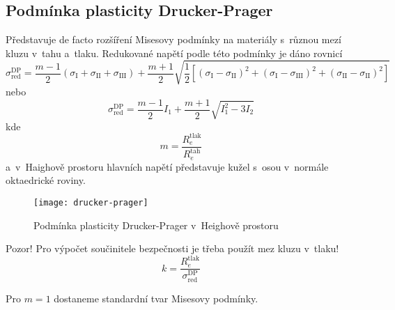 
\subsection{Podmínka plasticity Drucker-Prager}\label{sec:drucker-prager}
Představuje de facto rozšíření Misesovy podmínky na materiály s~různou mezí kluzu v~tahu a~tlaku.
Redukované napětí podle této podmínky je dáno rovnicí
\begin{equation}
	\sigma_\text{red}^\text{DP}
	= \frac{m-1}{2} \left(\sigma_\text{I} + \sigma_\text{II} + \sigma_\text{III}\right)
	+ \frac{m+1}{2} \sqrt{\frac{1}{2} \left[ (\sigma_\text{I}-\sigma_\text{II})^2 + (\sigma_\text{I}-\sigma_\text{III})^2 + (\sigma_\text{II}-\sigma_\text{II})^2 \right]}
\end{equation}
nebo
\begin{equation}
	\sigma_\text{red}^\text{DP}
	= \frac{m-1}{2} I_1 + \frac{m+1}{2} \sqrt{I_1^2 - 3 I_2}
\end{equation}
kde
\begin{equation*}
	m = \frac{R_e^\text{tlak}}{R_e^\text{tah}}
\end{equation*}
a~v~Haighově prostoru hlavních napětí představuje kužel s~osou v~normále oktaedrické roviny.
\begin{figure}[H]
	\centering
	\texttt{[image: drucker-prager]}
	\caption{Podmínka plasticity Drucker-Prager v~Heighově prostoru}
	\label{fig:drucker-prager}
\end{figure}

Pozor! Pro výpočet součinitele bezpečnosti je třeba použít mez kluzu v~tlaku!
\begin{equation}
k = \frac{R_e^\text{tlak}}{\sigma_\text{red}^\text{DP}}
\end{equation}

Pro $m=1$ dostaneme standardní tvar Misesovy podmínky.
